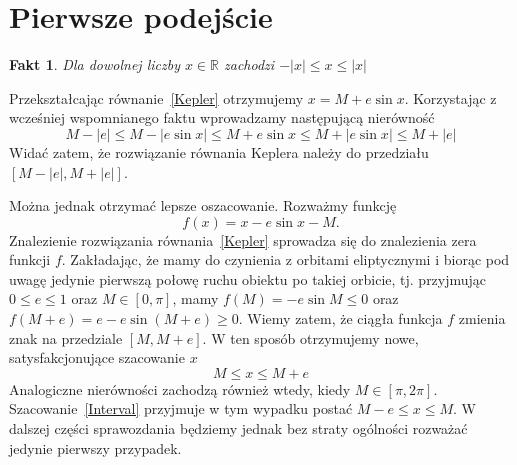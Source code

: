\documentclass[11pt,wide,leqno]{article}
\newtheorem*{fact}{Fakt}
\begin{document}
    \section{Pierwsze podejście}\label{bi}
        \begin{fact}
            Dla dowolnej liczby \(x \in \mathbb{R}\) zachodzi
            \(-|x| \leq x \leq |x|\)
        \end{fact}
        Przekształcając równanie~\eqref{Kepler} otrzymujemy \(x = M  + e\sin x\).
        Korzystając z wcześniej wspomnianego faktu wprowadzamy następującą nierówność
        \begin{equation*}
           M -|e| \leq M - |e\sin x| \leq M + e\sin x \leq M + |e\sin x| \leq M + |e|
        \end{equation*}
        Widać zatem, że rozwiązanie równania Keplera należy do przedziału
        \(\left[M -|e|, M + |e|\right]\). 

        Można jednak otrzymać lepsze oszacowanie.
        Rozważmy funkcję 
        \begin{equation}\label{Function}
            f(x) = x - e\sin x - M.
        \end{equation} 
        Znalezienie rozwiązania równania~\eqref{Kepler}
        sprowadza się do znalezienia zera funkcji \(f\). 
        Zakładając, że mamy do czynienia z orbitami eliptycznymi i biorąc pod uwagę jedynie pierwszą połowę ruchu obiektu po takiej orbicie, tj. przyjmując \(0 \leq e \leq 1\) oraz \(M \in \left[0,\pi\right]\), mamy
        \(f(M) = -e\sin M \leq 0\) oraz \(f(M + e) = e - e\sin(M + e) \geq 0\). Wiemy zatem, że ciągła funkcja \(f\)
        zmienia znak na przedziale \(\left[M,M + e\right]\). W ten sposób otrzymujemy nowe, satysfakcjonujące szacowanie \(x\)
        \begin{equation}\label{Interval}
            M \leq x \leq M + e
        \end{equation}
        Analogiczne nierówności zachodzą również wtedy, kiedy  
        \(M \in \left[\pi,2\pi\right]\). Szacowanie~\eqref{Interval}
        przyjmuje w tym wypadku postać \(M - e \leq x \leq M\). W dalszej części
        sprawozdania będziemy jednak bez straty ogólności rozważać jedynie pierwszy przypadek.
\end{document}
